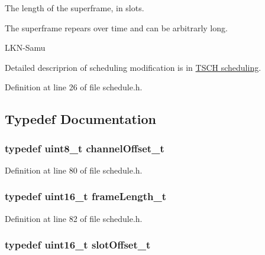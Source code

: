 The length of the superframe, in slots. 

The superframe repears over time and can be arbitrarly long.

\begin{DoxyRefDesc}{L\+K\+N-\/\+Samu}
\item[\hyperlink{_l_k_n_code_edits__LKN_code_edits000022}{L\+K\+N-\/\+Samu}]Detailed descriprion of scheduling modification is in \hyperlink{_l_k_n_contribution_TSCH_scheduling}{T\+S\+CH scheduling}.\end{DoxyRefDesc}


Definition at line 26 of file schedule.\+h.



\subsection{Typedef Documentation}
\subsubsection[{\texorpdfstring{channel\+Offset\+\_\+t}{channelOffset_t}}]{\setlength{\rightskip}{0pt plus 5cm}typedef {\bf uint8\+\_\+t} {\bf channel\+Offset\+\_\+t}}\hypertarget{group___schedule_gab53645758fe83985f0b35af7c5c2115e}{}\label{group___schedule_gab53645758fe83985f0b35af7c5c2115e}


Definition at line 80 of file schedule.\+h.

\subsubsection[{\texorpdfstring{frame\+Length\+\_\+t}{frameLength_t}}]{\setlength{\rightskip}{0pt plus 5cm}typedef {\bf uint16\+\_\+t} {\bf frame\+Length\+\_\+t}}\hypertarget{group___schedule_gab960413860c0b01b38ece025b0ee534d}{}\label{group___schedule_gab960413860c0b01b38ece025b0ee534d}


Definition at line 82 of file schedule.\+h.

\subsubsection[{\texorpdfstring{slot\+Offset\+\_\+t}{slotOffset_t}}]{\setlength{\rightskip}{0pt plus 5cm}typedef {\bf uint16\+\_\+t} {\bf slot\+Offset\+\_\+t}}\hypertarget{group___schedule_ga30a663860a70d8c9db2c3a8e66f544fc}{}\label{group___schedule_ga30a663860a70d8c9db2c3a8e66f544fc}


